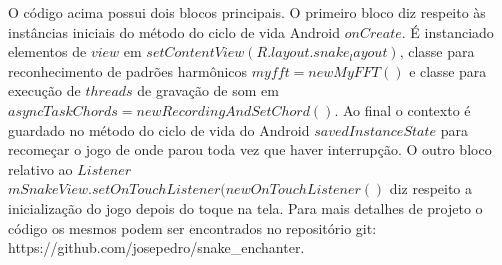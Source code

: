 O código acima possui dois blocos principais. O primeiro bloco diz respeito às instâncias iniciais do método do ciclo de vida Android $onCreate$. É instanciado elementos de $view$ em $setContentView(R.layout.snake_layout)$, classe para reconhecimento de padrões harmônicos $myfft = new MyFFT()$ e classe para execução de $threads$ de gravação de som em $asyncTaskChords = new RecordingAndSetChord()$. Ao final o contexto é guardado no método do ciclo de vida do Android $savedInstanceState$ para recomeçar o jogo de onde parou toda vez que haver interrupção. O outro bloco relativo ao $Listener$ $mSnakeView.setOnTouchListener(new OnTouchListener()$ diz respeito a inicialização do jogo depois do toque na tela. Para mais detalhes de projeto o código os mesmos podem ser encontrados no repositório git: https://github.com/josepedro/snake\_enchanter.

